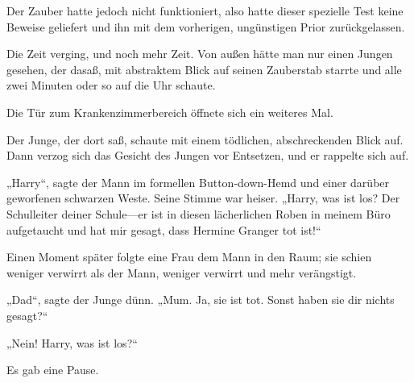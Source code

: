 Der Zauber hatte jedoch nicht funktioniert, also hatte dieser spezielle Test keine Beweise geliefert und ihn mit dem vorherigen, ungünstigen Prior zurückgelassen.

Die Zeit verging, und noch mehr Zeit.
Von außen hätte man nur einen Jungen gesehen, der dasaß, mit abstraktem Blick auf seinen Zauberstab starrte und alle zwei Minuten oder so auf die Uhr schaute.

Die Tür zum Krankenzimmerbereich öffnete sich ein weiteres Mal.


Der Junge, der dort saß, schaute mit einem tödlichen, abschreckenden Blick auf. Dann verzog sich das Gesicht des Jungen vor Entsetzen, und er rappelte sich auf.

„Harry“, sagte der Mann im formellen Button-down-Hemd und einer darüber geworfenen schwarzen Weste. Seine Stimme war heiser. „Harry, was ist los? Der Schulleiter deiner Schule—er ist in diesen lächerlichen Roben in meinem Büro aufgetaucht und hat mir gesagt, dass Hermine Granger tot ist!“

Einen Moment später folgte eine Frau dem Mann in den Raum; sie schien weniger verwirrt als der Mann, weniger verwirrt und mehr verängstigt.

„Dad“, sagte der Junge dünn. „Mum. Ja, sie ist tot. Sonst haben sie dir nichts gesagt?“

„Nein! Harry, was ist los?“

Es gab eine Pause.

